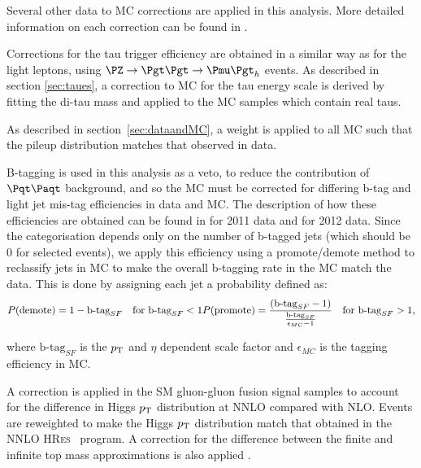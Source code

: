 Several other data to \ac{MC} corrections are applied in this analysis. 
More detailed information on each correction can be found in \cite{HIG-13-004}. 

Corrections for the tau trigger efficiency are 
obtained in a similar way as for the light leptons, using $\PZ\to\Pgt\Pgt\to\Pmu\Pgt_{h}$ events. As described in
section \ref{sec:taues}, a correction to \ac{MC} for the tau energy
scale is derived by fitting the di-tau mass and applied to the \ac{MC} samples
which contain real taus.

As described in section~\ref{sec:dataandMC}, a weight is applied to all \ac{MC} such
that the pileup distribution matches that observed in data.

B-tagging is used in this analysis as a veto, to reduce the contribution of
$\ttbar$ background, and so the \ac{MC} must be corrected for differing b-tag
and light jet mis-tag efficiencies in data and \ac{MC}. The description of how
these efficiencies are obtained can be found in \cite{CMS-PAS-BTV-11-004} for
2011 data and \cite{CMS-PAS-BTV-13-001} for 2012 data. Since the categorisation 
depends only on the number of b-tagged jets (which should be 0 for selected events), 
we apply this efficiency using a promote/demote method to reclassify jets in \ac{MC} 
to make the overall b-tagging rate in the \ac{MC} match the data. This is done
by assigning each jet a probability defined as:
\begin{equation}
P(\text{demote})  = 1 - \text{b-tag}_{SF} \quad \text{for } \text{b-tag}_{SF} < 1 \\
P(\text{promote}) = \frac{\left(\text{b-tag}_{SF} -
1\right)}{\frac{\text{b-tag}_{SF}}{\epsilon_{MC}-1} } \quad \text{for } \text{b-tag}_{SF} > 1 ,
\end{equation}

where $\text{b-tag}_{SF}$ is the $p_{\mathrm{T}}$ and $\eta$ dependent scale factor and
$\epsilon_{MC}$ is the tagging efficiency in \ac{MC}.

A correction is applied in the \ac{SM} gluon-gluon fusion signal
samples to account for the difference in Higgs $p_{\mathrm{T}}$ distribution at \ac{NNLO}
compared with \ac{NLO}. Events are reweighted to make the Higgs $p_{\mathrm{T}}$
distribution match that obtained in the \ac{NNLO} \textsc{HRes}~\cite{deFlorian:2012mx} program. 
A correction for the difference between the finite and infinite top
mass approximations is also applied \cite{Grazzini:2013mca}.


